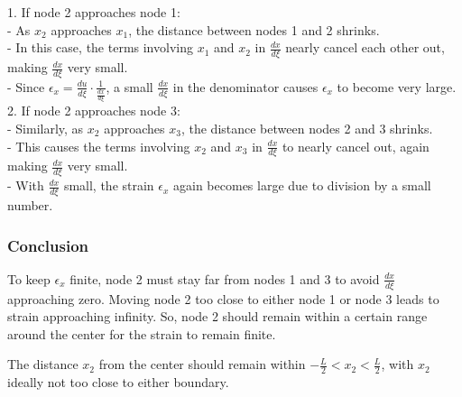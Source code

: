 1. If node 2 approaches node 1:\\
   - As \( x_2 \) approaches \( x_1 \), the distance between nodes 1 and 2 shrinks.\\
   - In this case, the terms involving \( x_1 \) and \( x_2 \) in \( \frac{dx}{d\xi} \) nearly cancel each other out, making \( \frac{dx}{d\xi} \) very small.\\
   - Since \( \epsilon_x = \frac{du}{d\xi} \cdot \frac{1}{\frac{dx}{d\xi}} \), a small \( \frac{dx}{d\xi} \) in the denominator causes \( \epsilon_x \) to become very large.\\

2. If node 2 approaches node 3:\\
   - Similarly, as \( x_2 \) approaches \( x_3 \), the distance between nodes 2 and 3 shrinks.\\
   - This causes the terms involving \( x_2 \) and \( x_3 \) in \( \frac{dx}{d\xi} \) to nearly cancel out, again making \( \frac{dx}{d\xi} \) very small.\\
   - With \( \frac{dx}{d\xi} \) small, the strain \( \epsilon_x \) again becomes large due to division by a small number.\\

\subsubsection*{Conclusion}

To keep \( \epsilon_x \) finite, node 2 must stay far from nodes 1 and 3 to avoid \( \frac{dx}{d\xi} \) approaching zero. Moving node 2 too close to either node 1 or node 3 leads to strain approaching infinity. 
So, node 2 should remain within a certain range around the center for the strain to remain finite.

The distance \( x_2 \) from the center should remain within \( -\frac{L}{2} < x_2 < \frac{L}{2} \), with \( x_2 \) ideally not too close to either boundary.
